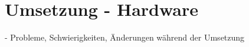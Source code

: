 \chapter{Umsetzung - Hardware} \label{umsetzung}

\nocite{*}
- Probleme, Schwierigkeiten, Änderungen während der Umsetzung